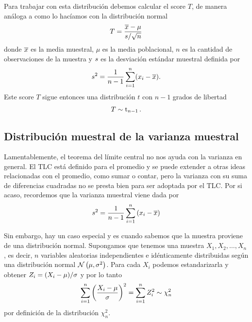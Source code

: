 Para trabajar con esta distribución debemos calcular el score \(T\), de manera análoga a como lo hacíamos con la distribución normal \[T = \frac{\overline{x}-\mu}{s/\sqrt{n}}\] donde \(\overline{x}\) es la media muestral, \(\mu\) es la media poblacional, \(n\) es la cantidad de observaciones de la muestra y \(s\) es la desviación estándar muestral definida por \[s^2 = \frac{1}{n-1}\sum_{i=1}^{n} (x_i - \overline{x}).\] Este score \(T\) sigue entonces una distribución \(t\) con \(n-1\) grados de libertad \[T \sim \operatorname{t}_{n-1}.\]

\subsection{Distribución muestral de la varianza muestral}

Lamentablemente, el teorema del límite central no nos ayuda con la varianza en general. El TLC está definido para el promedio y se puede extender a otras ideas relacionadas con el  promedio, como sumar o contar, pero la varianza con su suma de diferencias cuadradas no se presta bien para ser adoptada por el TLC. Por si acaso, recordemos que la varianza muestral viene dada por \[s^2 = \frac{1}{n-1}\sum_{i=1}^{n} \left( x_i - \overline{x} \right)\]

Sin embargo, hay un caso especial y es cuando sabemos que la muestra proviene de una distribución normal. Supongamos que tenemos una muestra  \(X_1, X_2, \ldots, X_n\), es decir, \(n\) variables aleatorias independientes e idénticamente distribuidas según una distribución normal \(\operatorname{\mathcal{N}}\left( \mu, \sigma^2 \right)\). Para cada \(X_i\) podemos estandarizarla y obtener \(Z_i=(X_i-\mu)/\sigma\) y por lo tanto \[\sum_{i=1}^{n}\left(\frac{X_i-\mu}{\sigma}\right)^2 = \sum_{i=1}^{n} Z_i^2 \sim \chi^2_n\] por definición de la distribución \(\chi^2_n\).

